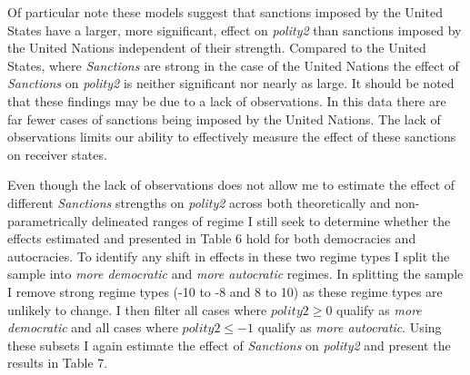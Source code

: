 \documentclass[a4paper]{article}\usepackage[]{graphicx}\usepackage[]{color}
\begin{document}
Of particular note these models suggest that sanctions imposed by the United States have a larger, more significant, effect on \textit{polity2} than sanctions imposed by the United Nations independent of their strength. Compared to the United States, where \textit{Sanctions} are strong in the case of the United Nations the effect of \textit{Sanctions} on \textit{polity2} is neither significant nor nearly as large. It should be noted that these findings may be due to a lack of observations. In this data there are far fewer cases of sanctions being imposed by the United Nations. The lack of observations limits our ability to effectively measure the effect of these sanctions on receiver states. 
\par
Even though the lack of observations does not allow me to estimate the effect of different \textit{Sanctions} strengths on \textit{polity2} across both theoretically and non-parametrically delineated ranges of regime I still seek to determine whether the effects estimated and presented in Table 6 hold for both democracies and autocracies. To identify any shift in effects in these two regime types I split the sample into \textit{more democratic} and \textit{more autocratic} regimes. In splitting the sample I remove strong regime types (-10 to -8 and 8 to 10) as these regime types are unlikely to change. I then filter all cases where $polity2 \geq 0$ qualify as \textit{more democratic} and all cases where $polity2 \leq -1$ qualify as \textit{more autocratic}. Using these subsets I again estimate the effect of \textit{Sanctions} on \textit{polity2} and present the results in Table 7. 
\end{document}
